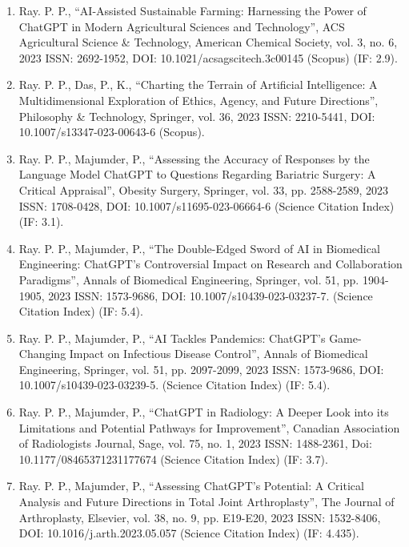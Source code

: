 \documentclass[11pt,a4paper]{moderncv}
\begin{document}
\begin{adjustwidth}{6em}{0pt}
\begin{enumerate}
		\item Ray. P. P., “AI-Assisted Sustainable Farming: Harnessing the Power of ChatGPT in Modern Agricultural Sciences and Technology”, ACS Agricultural Science \& Technology, American Chemical Society, vol. 3, no. 6, 2023 ISSN: 2692-1952, DOI: 10.1021/acsagscitech.3c00145 (Scopus) (IF: 2.9). 
		
		\item Ray. P. P., Das, P., K., “Charting the Terrain of Artificial Intelligence: A Multidimensional Exploration of Ethics, Agency, and Future Directions”, Philosophy \& Technology, Springer, vol. 36, 2023 ISSN: 2210-5441, DOI: 10.1007/s13347-023-00643-6 (Scopus). 
		
		\item Ray. P. P., Majumder, P., “Assessing the Accuracy of Responses by the Language Model ChatGPT to Questions Regarding Bariatric Surgery: A Critical Appraisal”, Obesity Surgery, Springer, vol. 33, pp. 2588-2589, 2023 ISSN: 1708-0428, DOI: 10.1007/s11695-023-06664-6 (Science Citation Index) (IF: 3.1). 
		
		\item Ray. P. P., Majumder, P., “The Double-Edged Sword of AI in Biomedical Engineering: ChatGPT's Controversial Impact on Research and Collaboration Paradigms”, Annals of Biomedical Engineering, Springer, vol. 51, pp. 1904-1905, 2023 ISSN: 1573-9686, DOI: 10.1007/s10439-023-03237-7. (Science Citation Index) (IF: 5.4). 
		
		\item Ray. P. P., Majumder, P., “AI Tackles Pandemics: ChatGPT's Game-Changing Impact on Infectious Disease Control”, Annals of Biomedical Engineering, Springer, vol. 51, pp. 2097-2099, 2023 ISSN: 1573-9686, DOI: 10.1007/s10439-023-03239-5. (Science Citation Index) (IF: 5.4).
		
		\item Ray. P. P., Majumder, P., “ChatGPT in Radiology: A Deeper Look into its Limitations and Potential Pathways for Improvement”, Canadian Association of Radiologists Journal, Sage, vol. 75, no. 1, 2023 ISSN: 1488-2361, Doi: 10.1177/08465371231177674 (Science Citation Index) (IF: 3.7). 
		
		\item Ray. P. P., Majumder, P., “Assessing ChatGPT's Potential: A Critical Analysis and Future Directions in Total Joint Arthroplasty”, The Journal of Arthroplasty, Elsevier, vol. 38, no. 9, pp. E19-E20, 2023 ISSN: 1532-8406, DOI: 10.1016/j.arth.2023.05.057 (Science Citation Index) (IF: 4.435). 
		

\end{enumerate}
\end{adjustwidth}
\end{document}
